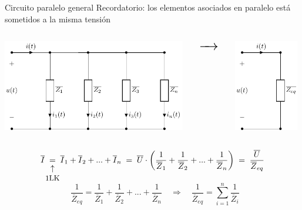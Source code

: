 \documentclass[aspectratio=169, usenames,svgnames,dvipsnames]{beamer}
\begin{document}
\begin{frame}{Circuito paralelo general}
    \vspace{3mm}
    \alert{Recordatorio}: los elementos asociados en \alert{paralelo} está sometidos a la \alert{misma tensión}

    \vspace{-2mm}
    \begin{columns}
    \begin{column}{0.55\linewidth}
    \begin{center}
        \includegraphics[height=4cm]{../figs/paralelo_general.pdf}
    \end{center}
    \end{column}
    \begin{column}{0.02\linewidth}
        \begin{center}
            $\LARGE \xrightarrow{\hspace*{0.5cm}}$ %
        \end{center}
    \end{column}
    \begin{column}{0.275\linewidth}
    \begin{center}
        \includegraphics[height=4cm]{../figs/paralelo_general_eq.pdf}
    \end{center}
    \end{column}
    \end{columns}

    \vspace{1mm}
    \begin{equation*}
		\overline{I} \; \underarrow[=][\uparrow]{\vspace{-3mm}\small 1LK} \; \overline{I}_1+\overline{I}_2+...+\overline{I}_n \; = \; \overline{U} \cdot\left(\dfrac{1}{\overline{Z}_1}+\dfrac{1}{\overline{Z}_2}+...+\dfrac{1}{\overline{Z}_n}\right) \; = \; \dfrac{\overline{U}}{\overline{Z}_{eq}}
	\end{equation*}
    \vspace{-4mm}
	\begin{equation*}
		\;\; \dfrac{1}{\overline{Z}_{eq}} = \dfrac{1}{\overline{Z}_1}+\dfrac{1}{\overline{Z}_2}+...+\dfrac{1}{\overline{Z}_n} \quad \Rightarrow \quad \boxed{\dfrac{1}{\overline{Z}_{eq}}=\sum_{i=1}^n \dfrac{1}{\overline{Z}_i}}
	\end{equation*}
\end{frame}
\end{document}
